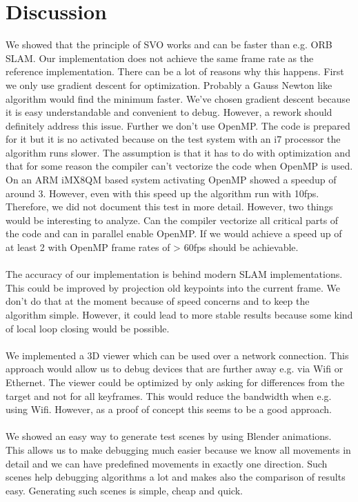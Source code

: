 \documentclass[11pt,a4paper,titlepage,oneside]{report}
\begin{document}
\chapter{Discussion}\label{ch:discussion}

We showed that the principle of SVO works and can be faster than e.g. ORB SLAM. Our implementation does not achieve the same frame rate as the reference implementation. There can be a lot of reasons why this happens. First we only use gradient descent for optimization. Probably a Gauss Newton like algorithm would find the minimum faster. We've chosen gradient descent because it is easy understandable and convenient to debug. However, a rework should definitely address this issue. Further we don't use OpenMP. The code is prepared for it but it is no activated because on the test system with an i7 processor the algorithm runs slower. The assumption is that it has to do with optimization and that for some reason the compiler can't vectorize the code when OpenMP is used. On an ARM iMX8QM based system activating OpenMP showed a speedup of around 3. However, even with this speed up the algorithm run with 10fps. Therefore, we did not document this test in more detail. However, two things would be interesting to analyze. Can the compiler vectorize all critical parts of the code and can in parallel enable OpenMP. If we would achieve a speed up of at least 2 with OpenMP frame rates of > 60fps should be achievable.\\\\
The accuracy of our implementation is behind modern SLAM implementations. This could be improved by projection old keypoints into the current frame. We don't do that at the moment because of speed concerns and to keep the algorithm simple. However, it could lead to more stable results because some kind of local loop closing would be possible.\\\\
We implemented a 3D viewer which can be used over a network connection. This approach would allow us to debug devices that are further away e.g. via Wifi or Ethernet. The viewer could be optimized by only asking for differences from the target and not for all keyframes. This would reduce the bandwidth when e.g. using Wifi. However, as a proof of concept this seems to be a good approach.\\\\
We showed an easy way to generate test scenes by using Blender animations. This allows us to make debugging much easier because we know all movements in detail and we can have predefined movements in exactly one direction. Such scenes help debugging algorithms a lot and makes also the comparison of results easy. Generating such scenes is simple, cheap and quick.\\\\
\end{document}

